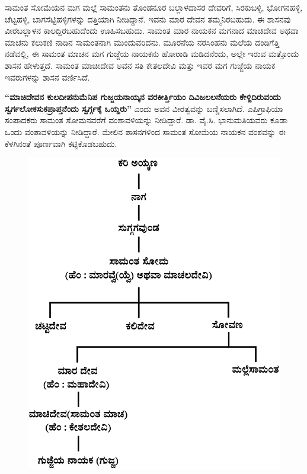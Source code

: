 \vskip 2pt

ಸಾಮಂತ ಸೋಮೆಯನ ಮಗ ಮಲ್ಲೆ ಸಾಮಂತನು ತೊಂಡನೂರ ಬಲ್ಲಾಳದಾಸರ ದೇವರಿಗೆ, ಸಿರಕುಬಳ್ಳಿ, ಭೋಗನಹಳ್ಳಿ, ಚೆಟ್ಟಹಳ್ಳಿ, ಬಾಗಸೆಟ್ಟಿಹಳ್ಳಿಗಳನ್ನು ದತ್ತಿಯಾಗಿ ನೀಡಿದ್ದಾನೆ. ಇವನು ಮಾರ ದೇವನ ತಮ್ಮನಿರಬಹುದು. ಈ ಶಾಸನವು ವೀರಬಲ್ಲಾಳನ ಕಾಲದ್ದಿರಬಹುದೆಂದು ಊಹಿಸಬಹುದು. ಸಾಮಂತ ಮಾರ ನಾಯಕನ ಮಗನಾದ ಮಾಚಿದೇವ ಅಥವಾ ಮಾಚನು ಕಲುಕಣಿ ನಾಡಿನ ಸಾಮಂತನಾಗಿ ಮುಂದುವರಿದನು. ಮೂರನೆಯ ನರಸಿಂಹನು ಮಲೆಯ ದಂಡಿಗೆತ್ತಿ ನಡೆವಲ್ಲಿ, ಈ ಸಾಮಂತ ಮಾಚನ ಮಗ ಗುಜ್ಜೆಯ ನಾಯಕನು ಹೋರಾಡಿ ಮಡಿದನೆಂದು, ಅಲ್ಲೇ ಇರುವ ಮತ್ತೊಂದು ಶಾಸನ ಹೇಳುತ್ತದೆ. ಸಾಮಂತ ಮಾಚೀದೇವ ಅವನ ಸತಿ ಕೇತಲದೇವಿ ಮತ್ತು ಇವರ ಮಗ ಗುಜ್ಜೆಯ ನಾಯಕ ಇವರುಗಳನ್ನು ಶಾಸನ ವರ್ಣಿಸಿದೆ.

\vskip 2pt

\textbf{“ಮಾಚಿದೇವನ ಕುಲದೀಪನುಮೆನಿಪ ಗುಜ್ಜಯನಾಯ್ಕನ ವರಕೀರ್ತ್ತಿಯಂ ದಿವಿಜಲಲನೆಯರು ಕೇಳ್ದಿದಿರುವಂದು\general{\break } ಸ್ವರ್ಗಲೋಕಸುಕಪ್ರಾಪ್ತನೆಂದು ಸ್ವರ್ಗ್ಗಕ್ಕೆ ಒಯ್ದರು”} ಎಂದು ಅವನ ವೀರತ್ವವನ್ನು ಬಣ್ಣಿಸಲಾಗಿದೆ. ಎಪಿಗ್ರಾಫಿಯಾ ಸಂಪಾದಕರು ಸಾಮಂತ ಸೋಮನವರೆಗೆ ವಂಶಾವಳಿಯನ್ನು ನೀಡಿದ್ದಾರೆ. ಡಾ. ವೈ.ಸಿ. ಭಾನುಮತಿಯವರು ಕೂಡಾ ಒಂದು ವಂಶಾವಳಿಯನ್ನು ನೀಡಿದ್ದಾರೆ. ಮೇಲಿನ ಶಾಸನಗಳಿಂದ ಸಾಮಂತ ಸೋಮೆಯ ನಾಯಕನ ವಂಶವನ್ನು ಈ ಕೆಳಗಿನಂತೆ ಪೂರ್ಣವಾಗಿ ಕಟ್ಟಿಕೊಡಬಹುದು.

\begin{figure}[H]
\includegraphics[scale=1.3]{images/chap3/chap3fig8.jpeg}
\end{figure}

